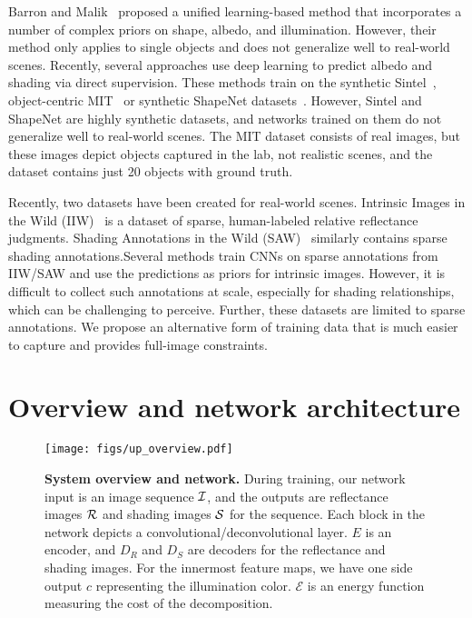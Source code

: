 \documentclass[10pt,twocolumn,letterpaper]{article}
\begin{document}
\smallskip{}  Barron and
Malik~\cite{barron2015shape} proposed a unified learning-based method
that incorporates a number of complex priors on shape, albedo, and
illumination. However, their method only applies to single objects and
does not generalize well to real-world scenes. Recently, several
approaches use deep learning to predict albedo and shading via direct
supervision. These methods train on the synthetic
Sintel~\cite{kim2016unified, butler2012naturalistic}, object-centric
MIT~\cite{grosse2009ground} or synthetic ShapeNet
datasets~\cite{chang2015shapenet, janner2017intrinsic}.
However, Sintel and ShapeNet are highly synthetic datasets, and
networks trained on them do not generalize well to real-world
scenes. The MIT dataset consists of real images, but these images
depict objects captured in the lab, not realistic scenes, and the
dataset contains just 20 objects with ground truth.


Recently, two datasets have been created for real-world
scenes. Intrinsic Images in the Wild (IIW)~\cite{bell2014intrinsic} is
a dataset of sparse, human-labeled relative reflectance
judgments. Shading Annotations in the Wild
(SAW)~\cite{kovacs2017shading} similarly contains sparse shading annotations.Several methods
\cite{zhou2015learning,zoran2015learning,narihira2015learning,kovacs2017shading}
train CNNs on sparse annotations from IIW/SAW and use the predictions
as priors for intrinsic images. However, it is difficult to collect
such annotations at scale, especially for shading relationships, which
can be challenging to perceive.  Further, these datasets are limited
to sparse annotations. We propose an alternative form of training data
that is much easier to capture and provides full-image constraints.


\section{Overview and network architecture}\label{sec:overview}\begin{figure}[t]
 \centering 
 \texttt{[image: figs/up\_overview.pdf]} \vspace{-0.5em}
 \caption{\textbf{System overview and network.}  During training, our
   network input is an image sequence $\mathcal{I}$, and the outputs are
   reflectance images $\mathcal{R}$ and shading images $\mathcal{S}$
   for the sequence. Each block in the network depicts a
   convolutional/deconvolutional layer. $E$ is an encoder, and $D_R$
   and $D_S$ are decoders for the reflectance and shading images. For
   the innermost feature maps, we have one side output $c$
   representing the illumination color. $\mathcal{E}$ is an energy
   function measuring the cost of the
   decomposition.\label{fig:network} } \vspace{-0.5em}
\end{figure}
\end{document}
